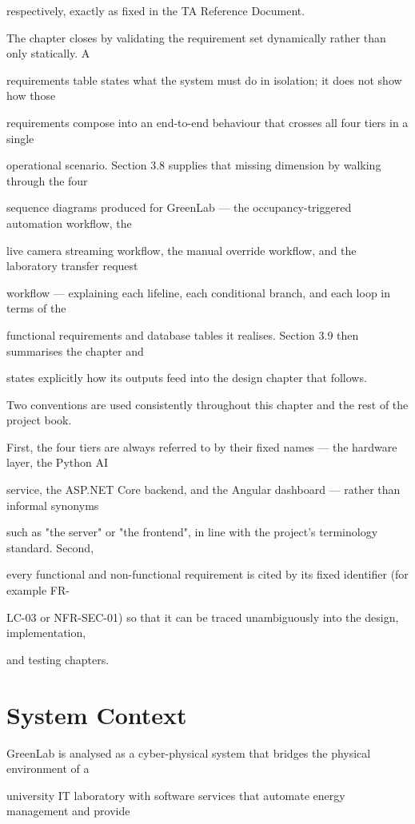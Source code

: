 respectively, exactly as fixed in the TA Reference Document.

The chapter closes by validating the requirement set dynamically rather than only statically. A

requirements table states what the system must do in isolation; it does not show how those

requirements compose into an end-to-end behaviour that crosses all four tiers in a single

operational scenario. Section 3.8 supplies that missing dimension by walking through the four

sequence diagrams produced for GreenLab --- the occupancy-triggered automation workflow, the

live camera streaming workflow, the manual override workflow, and the laboratory transfer request

workflow --- explaining each lifeline, each conditional branch, and each loop in terms of the

functional requirements and database tables it realises. Section 3.9 then summarises the chapter and

states explicitly how its outputs feed into the design chapter that follows.

Two conventions are used consistently throughout this chapter and the rest of the project book.

First, the four tiers are always referred to by their fixed names --- the hardware layer, the Python AI

service, the ASP.NET Core backend, and the Angular dashboard --- rather than informal synonyms

such as "the server" or "the frontend", in line with the project's terminology standard. Second,

every functional and non-functional requirement is cited by its fixed identifier (for example FR-

LC-03 or NFR-SEC-01) so that it can be traced unambiguously into the design, implementation,

and testing chapters.


\section{System Context}
GreenLab is analysed as a cyber-physical system that bridges the physical environment of a

university IT laboratory with software services that automate energy management and provide

